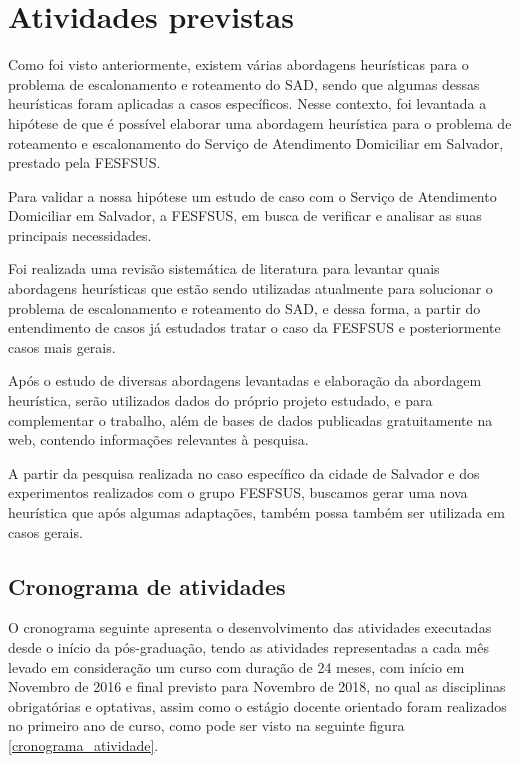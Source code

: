 
\section{Atividades previstas}
Como foi visto anteriormente, existem várias abordagens heurísticas para o problema de escalonamento e roteamento do \ac{SAD}, sendo que algumas dessas heurísticas foram aplicadas a casos específicos. Nesse contexto, foi levantada a hipótese de que é possível elaborar uma abordagem heurística para o problema de roteamento e escalonamento do Serviço de Atendimento Domiciliar em Salvador, prestado pela \ac{FESFSUS}.

Para validar a nossa hipótese um estudo de caso com o Serviço de Atendimento Domiciliar em Salvador, a \ac{FESFSUS}, em busca de verificar e analisar as suas principais necessidades.

Foi realizada uma revisão sistemática de literatura para levantar quais abordagens heurísticas que estão sendo utilizadas atualmente para solucionar o problema de escalonamento e roteamento do \ac{SAD}, e dessa forma, a partir do entendimento de casos já estudados tratar o caso da \ac{FESFSUS} e posteriormente casos mais gerais.

Após o estudo de diversas abordagens levantadas e elaboração da abordagem heurística, serão utilizados dados do próprio projeto estudado, e para complementar o trabalho, além de bases de dados publicadas gratuitamente na web, contendo informações relevantes à pesquisa.

A partir da pesquisa realizada no caso específico da cidade de Salvador e dos experimentos realizados com o grupo \ac{FESFSUS}, buscamos gerar uma nova heurística que após algumas adaptações, também possa também ser utilizada em casos gerais.

\subsection{Cronograma de atividades}

O cronograma seguinte apresenta o desenvolvimento das atividades executadas desde o início da pós-graduação, tendo as atividades representadas a cada mês levado em consideração um curso com duração de 24 meses, com início em Novembro de 2016 e final previsto para Novembro de 2018, no qual as disciplinas obrigatórias e optativas, assim como o estágio docente orientado foram realizados no primeiro ano de curso, como pode ser visto na seguinte figura \ref{cronograma_atividade}.

